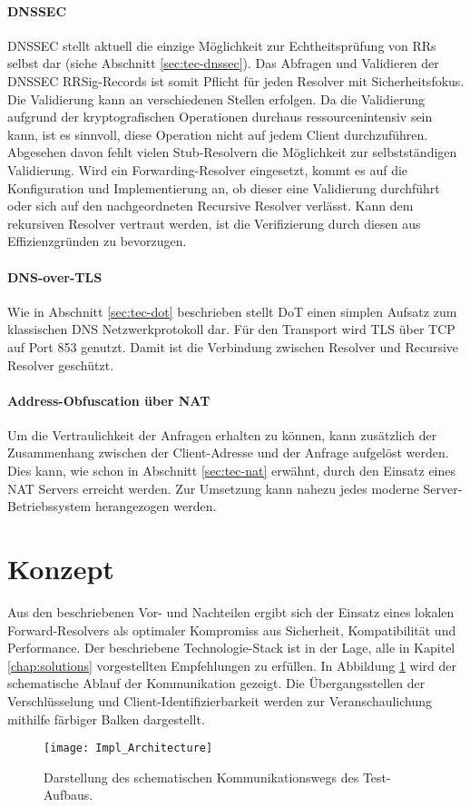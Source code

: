 \paragraph{DNSSEC}
DNSSEC stellt aktuell die einzige Möglichkeit zur Echtheitsprüfung von RRs selbst dar (siehe Abschnitt \ref{sec:tec-dnssec}). Das Abfragen und Validieren der \ac{DNSSEC} RRSig-Records ist somit Pflicht für jeden Resolver mit Sicherheitsfokus. Die Validierung kann an verschiedenen Stellen erfolgen. Da die Validierung aufgrund der kryptografischen Operationen durchaus ressourcenintensiv sein kann, ist es sinnvoll, diese Operation nicht auf jedem Client durchzuführen. Abgesehen davon fehlt vielen Stub-Resolvern die Möglichkeit zur selbstständigen Validierung. Wird ein Forwarding-Resolver eingesetzt, kommt es auf die Konfiguration und Implementierung an, ob dieser eine Validierung durchführt oder sich auf den nachgeordneten Recursive Resolver verlässt. Kann dem rekursiven Resolver vertraut werden, ist die Verifizierung durch diesen aus Effizienzgründen zu bevorzugen.

\paragraph{DNS-over-TLS}
Wie in Abschnitt \ref{sec:tec-dot} beschrieben stellt DoT einen simplen Aufsatz zum klassischen DNS Netzwerkprotokoll dar. Für den Transport wird TLS über TCP auf Port 853 genutzt\cite{rfc7858}. Damit ist die Verbindung zwischen Resolver und Recursive Resolver geschützt. 

\paragraph{Address-Obfuscation über NAT}
Um die Vertraulichkeit der Anfragen erhalten zu können, kann zusätzlich der Zusammenhang zwischen der Client-Adresse und der Anfrage aufgelöst werden. Dies kann, wie schon in Abschnitt \ref{sec:tec-nat} erwähnt, durch den Einsatz eines NAT Servers erreicht werden. Zur Umsetzung kann nahezu jedes moderne Server-Betriebssystem herangezogen werden.

\section{Konzept}
Aus den beschriebenen Vor- und Nachteilen ergibt sich der Einsatz eines lokalen Forward-Resolvers als optimaler Kompromiss aus Sicherheit, Kompatibilität und Performance. Der beschriebene Technologie-Stack ist in der Lage, alle in Kapitel \ref{chap:solutions} vorgestellten Empfehlungen zu erfüllen. In Abbildung \ref{img:impl-architecture} wird der schematische Ablauf der Kommunikation gezeigt. Die Übergangsstellen der Verschlüsselung und Client-Identifizierbarkeit werden zur Veranschaulichung mithilfe färbiger Balken dargestellt.
\begin{figure}[hb]
    \centering
    \texttt{[image: Impl\_Architecture]}
    \caption{Darstellung des schematischen Kommunikationswegs des Test-Aufbaus.}
    \label{img:impl-architecture}
\end{figure}

